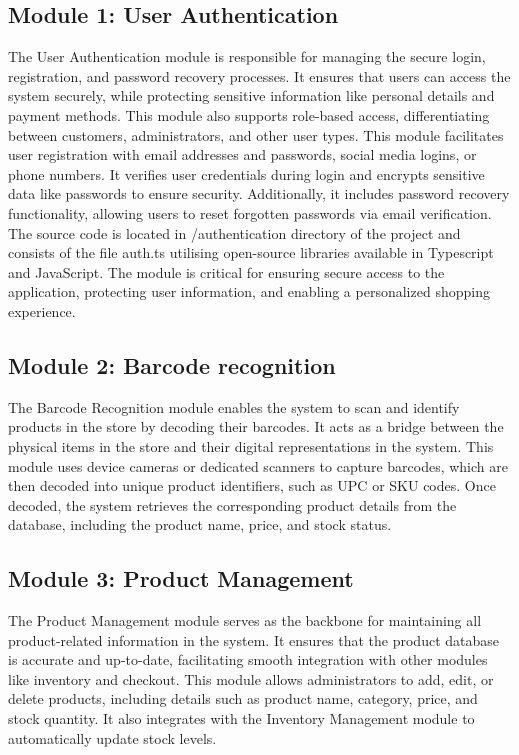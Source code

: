 \documentclass[conference]{IEEEtran}
\begin{document}
\subsection{Module 1: User Authentication} 
The User Authentication module is responsible for managing the secure login, registration, and password recovery processes. It ensures that users can access the system securely, while protecting sensitive information like personal details and payment methods. This module also supports role-based access, differentiating between customers, administrators, and other user types.
This module facilitates user registration with email addresses and passwords, social media logins, or phone numbers. It verifies user credentials during login and encrypts sensitive data like passwords to ensure security. Additionally, it includes password recovery functionality, allowing users to reset forgotten passwords via email verification. The source code is located in /authentication directory of the project and consists of the file auth.ts utilising open-source libraries available in Typescript and JavaScript. The module is critical for ensuring secure access to the application, protecting user information, and enabling a personalized shopping experience.

\subsection{Module 2: Barcode recognition}
The Barcode Recognition module enables the system to scan and identify products in the store by decoding their barcodes. It acts as a bridge between the physical items in the store and their digital representations in the system.
This module uses device cameras or dedicated scanners to capture barcodes, which are then decoded into unique product identifiers, such as UPC or SKU codes. Once decoded, the system retrieves the corresponding product details from the database, including the product name, price, and stock status.
 
\subsection{Module 3: Product Management} 
The Product Management module serves as the backbone for maintaining all product-related information in the system. It ensures that the product database is accurate and up-to-date, facilitating smooth integration with other modules like inventory and checkout.
This module allows administrators to add, edit, or delete products, including details such as product name, category, price, and stock quantity. It also integrates with the Inventory Management module to automatically update stock levels.
\end{document}
